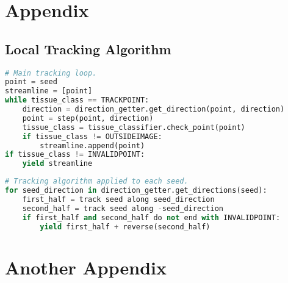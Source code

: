\begin{appendices}
\section{Appendix}
\subsection{Local Tracking Algorithm}
\label{appendix:algo}

\begin{lstlisting}[language=python]
# Main tracking loop.
point = seed
streamline = [point]
while tissue_class == TRACKPOINT:
    direction = direction_getter.get_direction(point, direction)
    point = step(point, direction)
    tissue_class = tissue_classifier.check_point(point)
    if tissue_class != OUTSIDEIMAGE:
        streamline.append(point)
if tissue_class != INVALIDPOINT:
    yield streamline
\end{lstlisting}

\begin{lstlisting}[language=python]
# Tracking algorithm applied to each seed.
for seed_direction in direction_getter.get_directions(seed):
    first_half = track seed along seed_direction
    second_half = track seed along -seed_direction
    if first_half and second_half do not end with INVALIDPOINT:
        yield first_half + reverse(second_half)
\end{lstlisting}

\section{Another Appendix}

\end{appendices}
